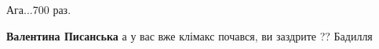 \begin{itemize}
\begin{itemize}
Ага...700 раз.

 
\textbf{Валентина Писанська} а у вас вже клімакс почався, ви заздрите ?? Бадилля


\end{itemize}

\end{itemize}

